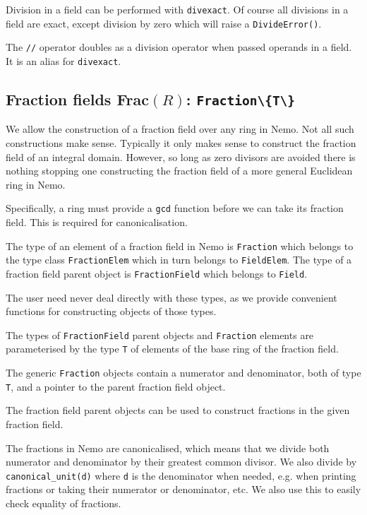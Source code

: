 \documentclass[a4paper,10pt]{article}
\newcommand{\code}{\lstinline}
\begin{document}
Division in a field can be performed with \code{divexact}. Of course all
divisions in a field are exact, except division by zero which will raise
a \code{DivideError()}.

The \code{//} operator doubles as a division operator when passed operands
in a field. It is an alias for \code{divexact}.

\subsection{Fraction fields Frac$(R)$: \code|Fraction\{T\}|}

We allow the construction of a fraction field over any ring in Nemo. Not all
such constructions make sense. Typically it only makes sense to construct the
fraction field of an integral domain. However, so long as zero divisors are
avoided there is nothing stopping one constructing the fraction field of a
more general Euclidean ring in Nemo.

Specifically, a ring must provide a \code{gcd} function before we can take its
fraction field. This is required for canonicalisation.

The type of an element of a fraction field in Nemo is \code{Fraction} which
belongs to the type class \code{FractionElem} which in turn belongs to
\code{FieldElem}. The type of a fraction field parent object is
\code{FractionField} which belongs to \code{Field}.

The user need never deal directly with these types, as we provide convenient
functions for constructing objects of those types.

The types of \code{FractionField} parent objects and \code{Fraction} elements
are parameterised by the type \code{T} of elements of the base ring of the
fraction field.

The generic \code{Fraction} objects contain a numerator and denominator, both
of type \code{T}, and a pointer to the parent fraction field object.

The fraction field parent objects can be used to construct fractions in the
given fraction field.

The fractions in Nemo are canonicalised, which means that we divide both
numerator and denominator by their greatest common divisor. We also divide
by \code{canonical_unit(d)} where \code{d} is the denominator when needed,
e.g. when printing fractions or taking their numerator or denominator, etc.
We also use this to easily check equality of fractions.
\end{document}
